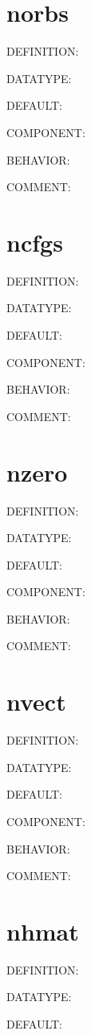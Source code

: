 \section{norbs}
{\color{red}DEFINITION:}

{\color{green}DATATYPE:}

{\color{blue}DEFAULT:}

{\color{brown}COMPONENT:}

{\color{purple}BEHAVIOR:}

{\color{olive}COMMENT:}

\section{ncfgs}
{\color{red}DEFINITION:}

{\color{green}DATATYPE:}

{\color{blue}DEFAULT:}

{\color{brown}COMPONENT:}

{\color{purple}BEHAVIOR:}

{\color{olive}COMMENT:}

\section{nzero}
{\color{red}DEFINITION:}

{\color{green}DATATYPE:}

{\color{blue}DEFAULT:}

{\color{brown}COMPONENT:}

{\color{purple}BEHAVIOR:}

{\color{olive}COMMENT:}

\section{nvect}
{\color{red}DEFINITION:}

{\color{green}DATATYPE:}

{\color{blue}DEFAULT:}

{\color{brown}COMPONENT:}

{\color{purple}BEHAVIOR:}

{\color{olive}COMMENT:}

\section{nhmat}
{\color{red}DEFINITION:}

{\color{green}DATATYPE:}

{\color{blue}DEFAULT:}

